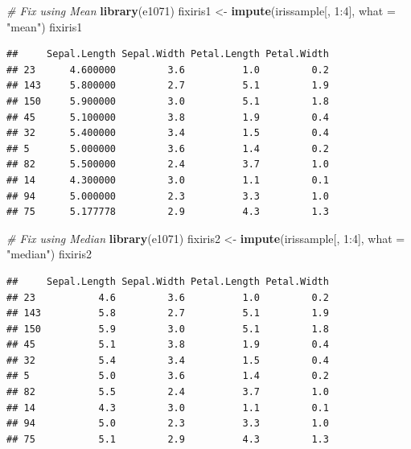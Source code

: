 \documentclass[ignorenonframetext,]{beamer}
\newenvironment{Shaded}{\begin{snugshade}}{\end{snugshade}}
\newcommand{\KeywordTok}[1]{\textcolor[rgb]{0.13,0.29,0.53}{\textbf{{#1}}}}
\newcommand{\DataTypeTok}[1]{\textcolor[rgb]{0.13,0.29,0.53}{{#1}}}
\newcommand{\DecValTok}[1]{\textcolor[rgb]{0.00,0.00,0.81}{{#1}}}
\newcommand{\StringTok}[1]{\textcolor[rgb]{0.31,0.60,0.02}{{#1}}}
\newcommand{\CommentTok}[1]{\textcolor[rgb]{0.56,0.35,0.01}{\textit{{#1}}}}
\newcommand{\NormalTok}[1]{{#1}}
\begin{document}
\begin{frame}[fragile]{}

\begin{Shaded}
\begin{Highlighting}[]
\CommentTok{# Fix using Mean}
\KeywordTok{library}\NormalTok{(e1071)}
\NormalTok{fixiris1 <-}\StringTok{ }\KeywordTok{impute}\NormalTok{(irissample[, }\DecValTok{1}\NormalTok{:}\DecValTok{4}\NormalTok{], }\DataTypeTok{what =} \StringTok{"mean"}\NormalTok{)}
\NormalTok{fixiris1}
\end{Highlighting}
\end{Shaded}

\begin{verbatim}
##     Sepal.Length Sepal.Width Petal.Length Petal.Width
## 23      4.600000         3.6          1.0         0.2
## 143     5.800000         2.7          5.1         1.9
## 150     5.900000         3.0          5.1         1.8
## 45      5.100000         3.8          1.9         0.4
## 32      5.400000         3.4          1.5         0.4
## 5       5.000000         3.6          1.4         0.2
## 82      5.500000         2.4          3.7         1.0
## 14      4.300000         3.0          1.1         0.1
## 94      5.000000         2.3          3.3         1.0
## 75      5.177778         2.9          4.3         1.3
\end{verbatim}

\end{frame}

\begin{frame}[fragile]{}

\begin{Shaded}
\begin{Highlighting}[]
\CommentTok{# Fix using Median}
\KeywordTok{library}\NormalTok{(e1071)}
\NormalTok{fixiris2 <-}\StringTok{ }\KeywordTok{impute}\NormalTok{(irissample[, }\DecValTok{1}\NormalTok{:}\DecValTok{4}\NormalTok{], }\DataTypeTok{what =} \StringTok{"median"}\NormalTok{)}
\NormalTok{fixiris2}
\end{Highlighting}
\end{Shaded}

\begin{verbatim}
##     Sepal.Length Sepal.Width Petal.Length Petal.Width
## 23           4.6         3.6          1.0         0.2
## 143          5.8         2.7          5.1         1.9
## 150          5.9         3.0          5.1         1.8
## 45           5.1         3.8          1.9         0.4
## 32           5.4         3.4          1.5         0.4
## 5            5.0         3.6          1.4         0.2
## 82           5.5         2.4          3.7         1.0
## 14           4.3         3.0          1.1         0.1
## 94           5.0         2.3          3.3         1.0
## 75           5.1         2.9          4.3         1.3
\end{verbatim}

\end{frame}
\end{document}

